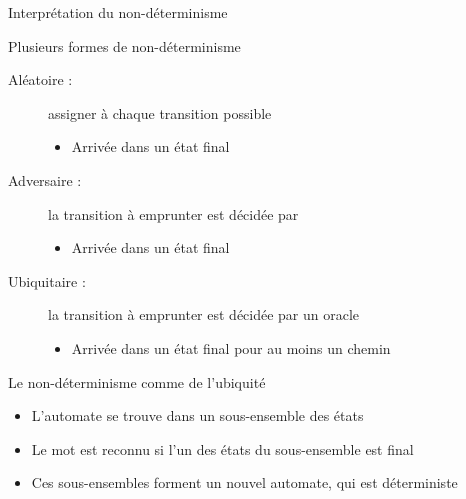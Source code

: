 
\begingroup

\begin{frame}{Interprétation du non-déterminisme}

  \begin{block}{Plusieurs formes de non-déterminisme}
    \begin{description}
    \item[Aléatoire :] assigner  à chaque transition possible
      \begin{itemize}
      \item Arrivée dans un état final 
      \end{itemize}
    \item[Adversaire :] la transition à emprunter est décidée par 
      \begin{itemize}
      \item Arrivée dans un état final 
      \end{itemize}
    \item[\alert{Ubiquitaire :}] la transition à emprunter est décidée par \alert{un oracle}
      \begin{itemize}
      \item Arrivée dans un état final \alert{pour au moins un chemin}
      \end{itemize}
    \end{description}
  \end{block}
  
  \begin{block}{Le non-déterminisme comme de l'ubiquité}
    \begin{itemize}
    \item L'automate se trouve dans un sous-ensemble des états
    \item Le mot est reconnu si l'un des états du sous-ensemble est final
    \item Ces sous-ensembles forment un nouvel automate, qui est déterministe
    \end{itemize}
  \end{block}

\end{frame}

\endgroup
\endinput
